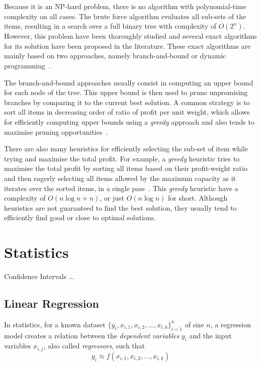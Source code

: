 Because it is an NP-hard problem, there is no algorithm with polynomial-time complexity on all cases.
The brute force algorithm evaluates all sub-sets of the items, resulting in a search over a full binary tree with complexity of $O(2^n)$.
However, this problem have been thoroughly studied and several exact algorithms for its solution have been proposed in the literature.
These exact algorithms are mainly based on two approaches, namely branch-and-bound or dynamic programming~\citep{martello77,martello99}.

The branch-and-bound approaches usually consist in computing an upper bound for each node of the tree.
This upper bound is then used to prune unpromising branches by comparing it to the current best solution.
A common strategy is to sort all items in decreasing order of ratio of profit per unit weight, which allows for efficiently computing upper bounds using a \textit{greedy} approach and also tends to maximise pruning opportunities~\citep{martello77,martello00}.

There are also many heuristics for efficiently selecting the sub-set of item while trying and maximise the total profit.
For example, a \textit{greedy} heuristic tries to maximise the total profit by sorting all items based on their profit-weight ratio and then eagerly selecting all items allowed by the maximum capacity as it iterates over the sorted items, in a single pass~\citep{dantzig57}.
This \textit{greedy} heuristic have a complexity of $O(n\log{n} + n)$, or just $O(n\log{n})$ for short.
Although heuristics are not guaranteed to find the best solution, they usually tend to efficiently find good or close to optimal solutions.

\section{Statistics}

Confidence Intervals ...

\subsection{Linear Regression}

In statistics, for a known dataset $\{y_i, x_{i,1}, x_{i,2}, \ldots, x_{i,k}\}_{i=1}^n$ of size $n$, a regression model creates a relation between the \textit{dependent variables} $y_i$ and the input variables $x_{i,j}$, also called \textit{regressors}, such that
\[
y_i \approx f(x_{i,1}, x_{i,2}, \ldots, x_{i,k})
\]

